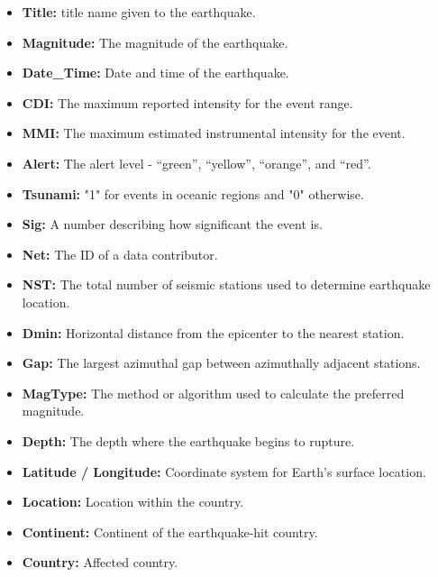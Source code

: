 \documentclass{article}
\begin{document}
\begin{itemize}
    \item \textbf{Title:} title name given to the earthquake.
    \item \textbf{Magnitude:} The magnitude of the earthquake.
    \item \textbf{Date\_Time:} Date and time of the earthquake.
    \item \textbf{CDI:} The maximum reported intensity for the event range.
    \item \textbf{MMI:} The maximum estimated instrumental intensity for the event.
    \item \textbf{Alert:} The alert level - “green”, “yellow”, “orange”, and “red”.
    \item \textbf{Tsunami:} "1" for events in oceanic regions and "0" otherwise.
    \item \textbf{Sig:} A number describing how significant the event is.
    \item \textbf{Net:} The ID of a data contributor.
    \item \textbf{NST:} The total number of seismic stations used to determine earthquake location.
    \item \textbf{Dmin:} Horizontal distance from the epicenter to the nearest station.
    \item \textbf{Gap:} The largest azimuthal gap between azimuthally adjacent stations.
    \item \textbf{MagType:} The method or algorithm used to calculate the preferred magnitude.
    \item \textbf{Depth:} The depth where the earthquake begins to rupture.
    \item \textbf{Latitude / Longitude:} Coordinate system for Earth's surface location.
    \item \textbf{Location:} Location within the country.
    \item \textbf{Continent:} Continent of the earthquake-hit country.
    \item \textbf{Country:} Affected country.
\end{itemize}
\end{document}
